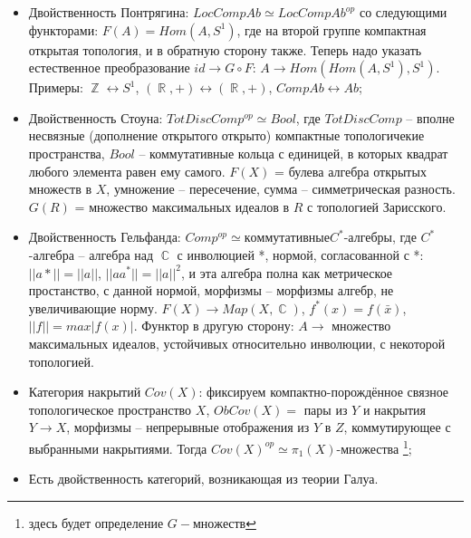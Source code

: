 \documentclass[a4paper]{article}
\theoremstyle{indented}
\theoremstyle{definition}
\theoremstyle{remark}
\DeclareMathOperator{\CC}{\mathbb{C}}
\DeclareMathOperator{\ZZ}{\mathbb{Z}}
\DeclareMathOperator{\RR}{\mathbb{R}}
\begin{document}
\begin{itemize}
\item Двойственность Понтрягина: $LocCompAb\simeq LocCompAb^{op}$ со следующими функторами: $F(A) = Hom(A, S^1)$, где на второй группе компактная открытая топология, и в обратную сторону также. Теперь надо указать естественное преобразование $id \rightarrow G\circ F$: $A \rightarrow Hom(Hom(A, S^1), S^1)$. Примеры: $\ZZ \longleftrightarrow S^1$, $(\RR, +) \longleftrightarrow (\RR, +)$, $CompAb \longleftrightarrow Ab$;
\item Двойственность Стоуна: $TotDiscComp^{op} \simeq  Bool$, где $TotDiscComp$ -- вполне несвязные (дополнение открытого открыто) компактные топологичекие пространства, $Bool$ -- коммутативные кольца с единицей, в которых квадрат любого элемента равен ему самого. $F(X)$ = булева алгебра открытых множеств в $X$, умножение -- пересечение, сумма -- симметрическая разность. $G(R)$ = множество максимальных идеалов в $R$ с топологией Зарисского.
\item Двойственность Гельфанда: $Comp^{op} \simeq коммутативные C^*$-алгебры, где $C^*$-алгебра -- алгебра над $\CC$ с инволюцией *, нормой, согласованной с *: $||a*|| = ||a||$, $||aa^*|| = ||a||^2$, и эта алгебра полна как метрическое простанство, с данной нормой, морфизмы -- морфизмы алгебр, не увеличивающие норму. $F(X) \rightarrow Map(X, \CC)$, $f^*(x) = f(\bar{x})$, $||f|| = max|f(x)|$. Функтор в другую сторону: $A \rightarrow$ множество максимальных идеалов, устойчивых относительно инволюции, с некоторой топологией.
\item Категория накрытий $Cov(X)$: фиксируем компактно-порождённое связное топологическое пространство $X$, $ObCov(X) =$ пары из $Y$ и накрытия $Y \rightarrow X$, морфизмы -- непрерывные отображения из $Y$ в $Z$, коммутирующее с выбранными накрытиями. Тогда $Cov(X)^{op} \simeq \pi_{1}(X)$-множества \footnote{здесь будет определение $G-множеств$};
\item Есть двойственность категорий, возникающая из теории Галуа.
\end{itemize}
\end{document}
